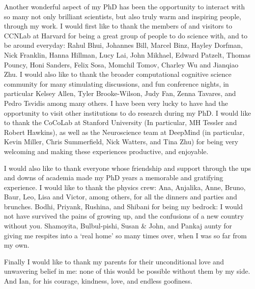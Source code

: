 Another wonderful aspect of my PhD has been the opportunity to interact with so many not only brilliant scientists, but also truly warm and inspiring people, through my work. I would first like to thank the members of and visitors to CCNLab at Harvard for being a great group of people to do science with, and to be around everyday: Rahul Bhui, Johannes Bill, Marcel Binz, Hayley Dorfman, Nick Franklin, Hanna Hillman, Lucy Lai, John Mikhael, Edward Patzelt, Thomas Pouncy, Honi Sanders, Felix Sosa,  Momchil Tomov, Charley Wu and Jianqiao Zhu. I would also like to thank the broader computational cognitive science community for many stimulating discussions, and fun conference nights, in particular Kelsey Allen, Tyler Brooke-Wilson, Judy Fan,  Zenna Tavares, and Pedro Tsvidis among many others. I have been very lucky to have had the opportunity to visit other institutions to do research during my PhD. I would like to thank the CoCoLab at Stanford University (In particular, MH Tessler and Robert Hawkins), as well as the Neuroscience team at DeepMind (in particular, Kevin Miller, Chris Summerfield, Nick Watters, and Tina Zhu) for being very welcoming and making these experiences productive, and enjoyable.

I would also like to thank everyone whose friendship and support through the ups and downs of academia made my PhD years a memorable and gratifying experience. I would like to thank the physics crew: Ana, Anjalika, Anne, Bruno, Baur, Leo, Lisa and Victor, among others, for all the dinners and parties and brunches. Bodhi, Priyank, Rushina, and Shibani for being my bedrock: I would not have survived the pains of growing up, and the confusions of a new country without you. Shamoyita, Bulbul-pishi, Susan \& John, and Pankaj aunty for giving me respites into a `real home' so many times over, when I was so far from my own.

Finally I would like to thank my parents for their unconditional love and unwavering belief in me: none of this would be possible without them by my side. And Ian, for his courage, kindness, love, and endless goofiness.

%
%
%
%
%
%
%
%




